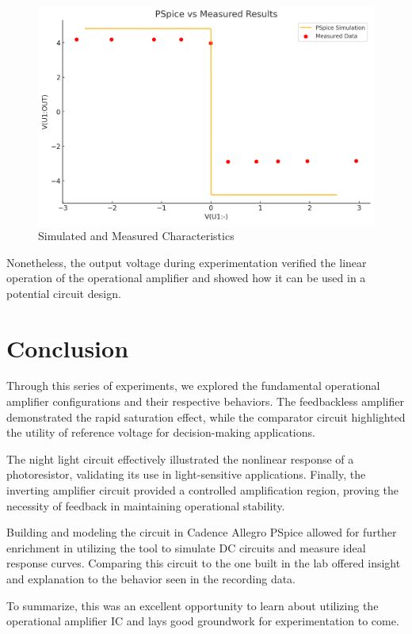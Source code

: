 \documentclass[12pt]{article}
\begin{document}
\begin{figure}[H]
	\centering
	\includegraphics[width=12cm]{03_pspice}
	\caption{Simulated and Measured Characteristics}
	\label{fig:03_pspice}
\end{figure}

Nonetheless, the output voltage during experimentation verified the linear
operation of the operational amplifier and showed how it can be used in a
potential circuit design.

\section{Conclusion}
Through this series of experiments, we explored the fundamental operational
amplifier configurations and their respective behaviors. The feedbackless
amplifier demonstrated the rapid saturation effect, while the comparator circuit
highlighted the utility of reference voltage for decision-making applications.

The night light circuit effectively illustrated the nonlinear response of a
photoresistor, validating its use in light-sensitive applications. Finally, the
inverting amplifier circuit provided a controlled amplification region, proving
the necessity of feedback in maintaining operational stability.

Building and modeling the circuit in Cadence Allegro PSpice allowed for further
enrichment in utilizing the tool to simulate DC circuits and measure ideal
response curves. Comparing this circuit to the one built in the lab offered
insight and explanation to the behavior seen in the recording data.

To summarize, this was an excellent opportunity to learn about utilizing the
operational amplifier IC and lays good groundwork for experimentation to come.
\end{document}

